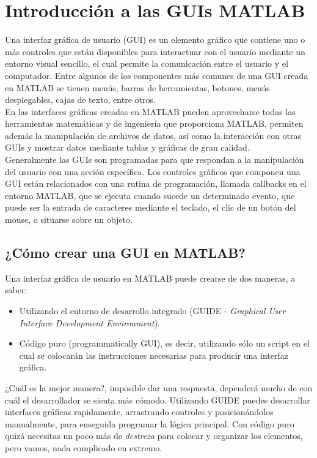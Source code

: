 \chapter{Introducción a las GUIs MATLAB}\label{introduccion-a-las-guis-matlab}

Una interfaz gráfica de usuario (GUI) es un elemento gráfico que
contiene uno o más controles que están disponibles para interactuar con
el usuario mediante un entorno visual sencillo, el cual permite la
comunicación entre el usuario y el computador. Entre algunos de los
componentes más comunes de una GUI creada en MATLAB se tienen menús,
barras de herramientas, botones, menús desplegables, cajas de texto,
entre otros. \\

En las interfaces gráficas creadas en MATLAB pueden aprovecharse todas
las herramientas matemáticas y de ingeniería que proporciona MATLAB,
permiten además la manipulación de archivos de datos, así como la
interacción con otras GUIs y mostrar datos mediante tablas y gráficas de
gran calidad. \\

Generalmente las GUIs son programadas para que respondan a la
manipulación del usuario con una acción específica. Los controles
gráficos que componen una GUI están relacionados con una rutina de
programación, llamada callbacks en el entorno MATLAB, que se ejecuta
cuando sucede un determinado evento, que puede ser la entrada de
caracteres mediante el teclado, el clic de un botón del mouse, o
situarse sobre un objeto. \\

\section{¿Cómo crear una GUI en MATLAB?}\label{como-crear-una-gui-en-matlab}

Una interfaz gráfica de usuario en MATLAB puede crearse de dos maneras,
a saber:

\begin{itemize}
\item
  Utilizando el entorno de desarrollo integrado (GUIDE - \emph{Graphical
  User Interface Development Environment}).
\item
  Código puro (programmatically GUI), es decir, utilizando sólo un
  script en el cual se colocarán las instrucciones necesarias para
  producir una interfaz gráfica.
\end{itemize}

¿Cuál es la mejor manera?, imposible dar una respuesta, dependerá mucho
de con cuál el desarrollador se sienta más cómodo. Utilizando GUIDE
puedes desarrollar interfaces gráficas rapidamente, arrastrando
controles y posicionándolos manualmente, para enseguida programar la
lógica principal. Con código puro quizá necesitas un poco más de
\emph{destreza} para colocar y organizar los elementos, pero vamos, nada
complicado en extremo. \\

